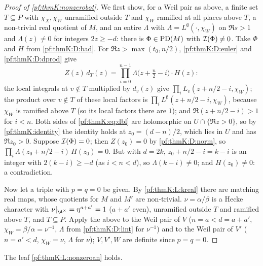 \begin{proof}[Proof of \cref{pf:thmK:nonzerobot}]
We first show, for a Weil pair as above, a finite set $T\subseteq P$ with $\chi_X,\chi_W$ unramified outside $T$ and $\chi_W$
ramified at all places above $T$, a non-trivial real quotient of $M$, and an entire $\Lambda$ with $\Lambda=L^\emptyset(\cdot,
\chi_W)$ on $\Re s>1$ and $\Lambda(z)\ne0$ for integers $2z\ge-d$: there is $\Phi\in\operatorname{PD}(M)$ with $\mathcal{I}(\Phi)\ne0$.
Take $\Phi$ and $H$ from \ref{pf:thmK:D:bad}. For $\Re z>\max(t_0,n/2)$, \ref{pf:thmK:D:euler} and \ref{pf:thmK:D:dprod} give
\begin{equation}\label{pf:thmK:eq:dbl}
Z(z)\,d_T(z)=\prod_{i=0}^{n-1}\Lambda\bigl(z+\tfrac n2-i\bigr)\cdot H(z):
\end{equation}
the local integrals at $v\notin T$ multiplied by $d_v(z)$ give $\prod_iL_v(z+n/2-i,\chi_W)$; the product over $v\notin T$ of
these local factors is $\prod_iL^\emptyset(z+n/2-i,\chi_W)$, because $\chi_W$ is ramified above $T$ (so its local factors there
are $1$); and $\Re(z+n/2-i)>1$ for $i<n$. Both sides of \eqref{pf:thmK:eq:dbl} are holomorphic on $U\cap\{\Re z>0\}$, so by
\cref{pf:thmK:identity} the identity holds at $z_0=(d-n)/2$, which lies in $U$ and has $\Re z_0>0$. Suppose $\mathcal{I}(\Phi)=0$;
then $Z(z_0)=0$ by \ref{pf:thmK:D:norm}, so $\prod_i\Lambda(z_0+n/2-i)\,H(z_0)=0$. But with $d=2k$, $z_0+n/2-i=k-i$ is an
integer with $2(k-i)\ge-d$ (as $i<n<d$), so $\Lambda(k-i)\ne0$; and $H(z_0)\ne0$: a contradiction.

Now let a triple with $p=q=0$ be given. By \ref{pf:thmK:L:kreal} there are matching real maps, whose quotients for $M$ and $M'$
are non-trivial. $\nu=\alpha/\beta$ is a Hecke character with $\nu|_{\A^\times}=\eta^{a+a'}=1$ ($a+a'$ even), unramified
outside $T$ and ramified above $T$, and $T\subseteq P$. Apply the above to the Weil pair of $V$ ($n=a<d=a+a'$,
$\chi_W=\beta/\alpha=\nu^{-1}$, $\Lambda$ from \ref{pf:thmK:D:lint} for $\nu^{-1}$) and to the Weil pair of $V'$ ($n=a'<d$,
$\chi_W=\nu$, $\Lambda$ for $\nu$); $V,V',W$ are definite since $p=q=0$.
\end{proof}

\begin{proposition}\label{pf:thmK:nonzeroan}
The leaf \ref{pf:thmK:L:nonzeroan} holds.
\end{proposition}

